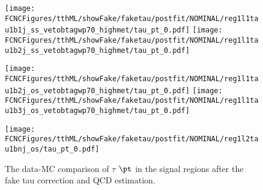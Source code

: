 \begin{figure}[H]
\centering
\texttt{[image: \\FCNCFigures/tthML/showFake/faketau/postfit/NOMINAL/reg1l1tau1b1j\_ss\_vetobtagwp70\_highmet/tau\_pt\_0.pdf]}
\texttt{[image: \\FCNCFigures/tthML/showFake/faketau/postfit/NOMINAL/reg1l1tau1b2j\_ss\_vetobtagwp70\_highmet/tau\_pt\_0.pdf]}

\texttt{[image: \\FCNCFigures/tthML/showFake/faketau/postfit/NOMINAL/reg1l1tau1b2j\_os\_vetobtagwp70\_highmet/tau\_pt\_0.pdf]}
\texttt{[image: \\FCNCFigures/tthML/showFake/faketau/postfit/NOMINAL/reg1l1tau1b3j\_os\_vetobtagwp70\_highmet/tau\_pt\_0.pdf]}

\texttt{[image: \\FCNCFigures/tthML/showFake/faketau/postfit/NOMINAL/reg1l2tau1bnj\_os/tau\_pt\_0.pdf]}


\caption{ The data-MC comparison of $\tau$ $\pt$ in the signal regions after the fake tau correction and QCD estimation. }
\label{fig:wjet_pt_postfit}
\end{figure}
